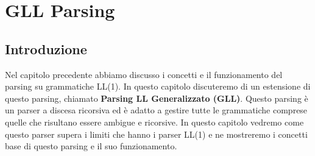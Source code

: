 \chapter{GLL Parsing}\label{cap2}
\section{Introduzione}
Nel capitolo precedente abbiamo discusso i concetti e il funzionamento del parsing su grammatiche LL(1). In questo capitolo discuteremo di un estensione di questo parsing, chiamato \textbf{Parsing LL Generalizzato (GLL)}. Questo parsing è un parser a discesa ricorsiva ed è adatto a gestire tutte le grammatiche comprese quelle che risultano essere ambigue e ricorsive. In questo capitolo vedremo come questo parser supera i limiti che hanno i parser LL(1) e ne mostreremo i concetti base di questo parsing e il suo funzionamento.

